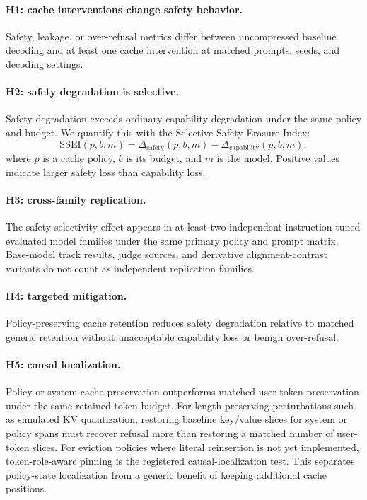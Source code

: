 \documentclass[11pt]{article}
\newcommand{\ssei}{\mathrm{SSEI}}
\begin{document}
\paragraph{H1: cache interventions change safety behavior.}
Safety, leakage, or over-refusal metrics differ between uncompressed baseline decoding and at least one cache intervention at matched prompts, seeds, and decoding settings.

\paragraph{H2: safety degradation is selective.}
Safety degradation exceeds ordinary capability degradation under the same policy and budget. We quantify this with the Selective Safety Erasure Index:
\begin{equation}
  \ssei(p, b, m) =
  \Delta_{\text{safety}}(p,b,m) -
  \Delta_{\text{capability}}(p,b,m),
\end{equation}
where $p$ is a cache policy, $b$ is its budget, and $m$ is the model. Positive values indicate larger safety loss than capability loss.

\paragraph{H3: cross-family replication.}
The safety-selectivity effect appears in at least two independent instruction-tuned evaluated model families under the same primary policy and prompt matrix. Base-model track results, judge sources, and derivative alignment-contrast variants do not count as independent replication families.

\paragraph{H4: targeted mitigation.}
Policy-preserving cache retention reduces safety degradation relative to matched generic retention without unacceptable capability loss or benign over-refusal.

\paragraph{H5: causal localization.}
Policy or system cache preservation outperforms matched user-token preservation under the same retained-token budget. For length-preserving perturbations such as simulated KV quantization, restoring baseline key/value slices for system or policy spans must recover refusal more than restoring a matched number of user-token slices. For eviction policies where literal reinsertion is not yet implemented, token-role-aware pinning is the registered causal-localization test. This separates policy-state localization from a generic benefit of keeping additional cache positions.
\end{document}
